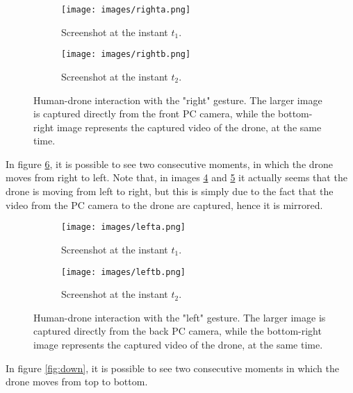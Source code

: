 \begin{figure}[H]
    \centering
    \begin{subfigure}[b]{0.49 \textwidth}
        \centering
        \texttt{[image: images/righta.png]}
        \caption[]{Screenshot at the instant $t_1$.}
        \label{fig:righta}
    \end{subfigure}
    \hfill
    \begin{subfigure}[b]{0.49 \textwidth}
        \centering
        \texttt{[image: images/rightb.png]}
        \caption[]{Screenshot at the instant $t_2$.}
        \label{fig:rightb}
    \end{subfigure}
    \caption[Human-drone interaction with the "right" gesture.]{Human-drone interaction with the "right" gesture. The larger image is captured directly from the front PC camera, while the bottom-right image represents the captured video of the drone, at the same time.}
    \label{fig:right}
\end{figure}

\noindent In figure \ref{fig:left}, it is possible to see two consecutive moments, in which the drone moves from right to left. Note that, in images \ref{fig:lefta} and \ref{fig:leftb} it actually seems that the drone is moving from left to right, but this is simply due to the fact that the video from the PC camera to the drone are captured, hence it is mirrored.

\begin{figure}[H]
    \centering
    \begin{subfigure}[b]{0.49 \textwidth}
        \centering
        \texttt{[image: images/lefta.png]}
        \caption[]{Screenshot at the instant $t_1$.}
        \label{fig:lefta}
    \end{subfigure}
    \hfill
    \begin{subfigure}[b]{0.49 \textwidth}
        \centering
        \texttt{[image: images/leftb.png]}
        \caption[]{Screenshot at the instant $t_2$.}
        \label{fig:leftb}
    \end{subfigure}
    \caption[Human-drone interaction with the "left" gesture.]{Human-drone interaction with the "left" gesture. The larger image is captured directly from the back PC camera, while the bottom-right image represents the captured video of the drone, at the same time.}
    \label{fig:left}
\end{figure}

\noindent In figure \ref{fig:down}, it is possible to see two consecutive moments in which the drone moves from top to bottom.

